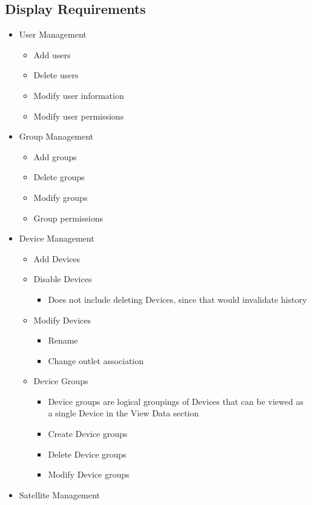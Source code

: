 \subsection{Display Requirements}
\begin{itemize}
 \item User Management
	\begin{itemize}
	 \item Add users
	 \item Delete users
	 \item Modify user information
	 \item Modify user permissions
	\end{itemize}
 \item Group Management
	\begin{itemize}
	 \item Add groups
	 \item Delete groups
	 \item Modify groups
	 \item Group permissions
	\end{itemize}
 \item Device Management
	\begin{itemize}
	 \item Add Devices
	 \item Disable Devices
		\begin{itemize}
	 		\item Does not include deleting Devices, since that would invalidate history
		\end{itemize}
	 \item Modify Devices
		\begin{itemize}
	 		\item Rename
	 		\item Change outlet association
		\end{itemize}
	 \item Device Groups
		\begin{itemize}
		 \item Device groups are logical groupings of Devices that can be 
		 	viewed as a single Device in the View Data section
		 \item Create Device groups
		 \item Delete Device groups
		 \item Modify Device groups
		\end{itemize}
	\end{itemize}
 \item Satellite Management

\end{itemize}
